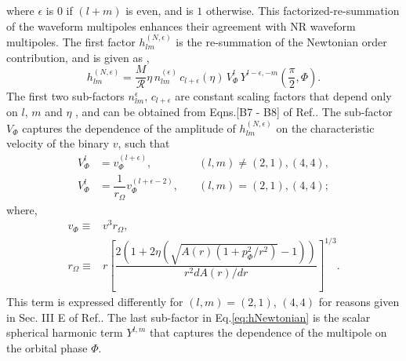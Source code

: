 \documentclass[aps,
prd,
amsmath,
amssymb,
twocolumn,
floatfix,
groupedaddress]{revtex4-1}
\newcommand{\ii}{{\rm i}}
\def\l({\left(}
\def\r){\right)}
\begin{document}
where $\epsilon$ is $0$ if $\l(l+m\r)$ is even, and is $1$ otherwise. This factorized-re-summation of the waveform multipoles enhances their agreement with NR waveform multipoles\citep{EOBNRdevel01,EOBNRdevel02,EOBNR01}. The first factor $h^{(N,\epsilon)}_{lm}$ is the re-summation of the Newtonian order contribution, and is given as \citep{DamourFluxhlm01},
\begin{equation}\label{eq:hNewtonian}
h^{(N,\epsilon)}_{lm} = \dfrac{M}{\mathcal{R}}\eta\,n_{lm}^{(\epsilon)}\,c_{l+\epsilon}(\eta)\,V^l_{\Phi}\,Y^{l-\epsilon,-m}\left(\dfrac{\pi}{2},\Phi\right).
\end{equation}
The first two sub-factors $n_{lm}^{\epsilon},\,c_{l+\epsilon}$ are constant scaling factors that depend only on $l$, $m$ and $\eta$ \citep{BuonannoEOBTerms}, and can be obtained from Eqns.[B7 - B8] of Ref.\citep{BuonannoEOBv2Main}. The sub-factor $V_{\Phi}$ captures the dependence of the amplitude of $h^{(N,\epsilon)}_{lm}$ on the characteristic velocity of the binary $v$, such that 
\begin{subequations}
\begin{align}
V_{\Phi}^l &= v_{\Phi}^{(l+\epsilon)},\quad &(l,m) \neq (2,1) , (4,4),\\
V_{\Phi}^l &= \dfrac{1}{r_{\Omega}}v_{\Phi}^{(l+\epsilon-2)},\quad &(l,m) = (2,1) , (4,4);
\end{align}
\end{subequations}
where,
\begin{eqnarray}
v_{\Phi} \equiv & v^3 r_{\Omega},\\
r_{\Omega} \equiv & r\left[ \dfrac{2\left(1+2\eta\left(\sqrt{A(r)(1+p_{\Phi}^2/r^2)} -1 \right) \right)}{r^2dA(r)/dr} \right]^{1/3}.
\end{eqnarray}
This term is expressed differently for $(l,m)=(2,1)$, $(4,4)$ for reasons given in Sec. III E of Ref.\citep{BuonannoEOBv2Main}. The last sub-factor in Eq.\eqref{eq:hNewtonian} is the scalar spherical harmonic term $Y^{l,m}$ that captures the dependence of the multipole on the orbital phase $\Phi$.
\end{document}
